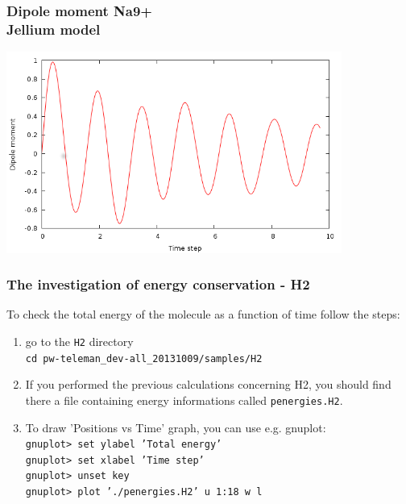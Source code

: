 \documentclass[10pt]{beamer}
\begin{document}
\begin{frame}
\frametitle{Dipole moment Na9+\\
Jellium model}

\centering
\includegraphics[width=11cm]{fig/dipolena9j} 

\end{frame}

\begin{frame}
\frametitle{The investigation of energy conservation - H2}

To check the total energy of the molecule as a function of time follow the steps:

\begin{enumerate}
\item go to the {\tt H2} directory\\
{\tt cd pw-teleman\_dev-all\_20131009/samples/H2}
\item If you performed the previous calculations concerning H2, you should find there a file containing energy informations called {\tt penergies.H2}. 
\item To draw   'Positions vs Time' graph, you can use e.g. gnuplot:\\
\vspace*{0.1cm}
{\tt gnuplot> set ylabel 'Total energy'}\\
{\tt gnuplot> set xlabel 'Time step'}\\
{\tt gnuplot> unset key}\\
{\tt gnuplot> plot './penergies.H2' u 1:18 w l}\\


\end{enumerate}


\end{frame}
\end{document}
